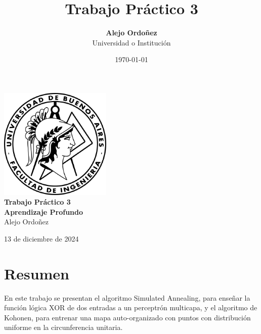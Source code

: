 \documentclass[12pt,a4paper]{article}
\title{\textbf{Trabajo Práctico 3}}
\author{\textbf{Alejo Ordoñez}\\ Universidad o Institución}
\date{\today}
\begin{document}
\begin{titlepage}
    \centering
    \vspace*{5cm}

    \includegraphics[width=0.4\textwidth]{logo-fiuba.png}\\[1cm]

    {\Huge \textbf{Trabajo Práctico 3}}\\[0.2cm]

    {\large \textbf{Aprendizaje Profundo}\\ Alejo Ordoñez}

    \vfill

    {\large 13 de diciembre de 2024}
\end{titlepage}

\section*{Resumen}
En este trabajo se presentan el algoritmo Simulated Annealing, para enseñar la función lógica XOR de dos entradas a un perceptrón multicapa, y el algoritmo de Kohonen, para entrenar una mapa auto-organizado con puntos con distribución uniforme en la circunferencia unitaria.

\newpage
\end{document}
